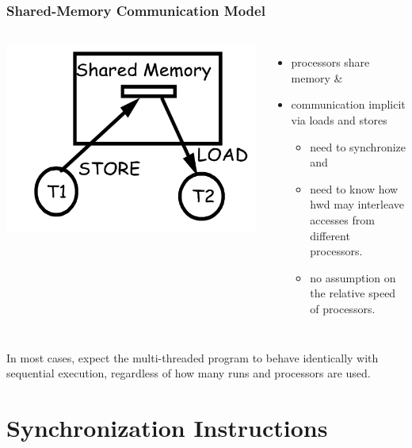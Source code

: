 \documentclass{beamer}
\newcommand{\emp}[1]{\textcolor{DikuRed}{ #1}}
\begin{document}
\begin{frame}[fragile,t]
\frametitle{Shared-Memory Communication Model}

\bigskip
\begin{columns}
\includegraphics[width=27ex]{Ch7Figs/ShMem}\pause
{}
\begin{itemize}
    \item processors share memory \&\medskip
    \item communication implicit via loads and stores
    \begin{itemize}
        \item need to synchronize and\smallskip
        \item need to know how hwd may interleave 
                accesses from different processors.\medskip
        \item \alert{no assumption on the relative speed of processors}.
    \end{itemize}
\end{itemize}
\end{columns}
\bigskip

In most cases, \emp{expect the multi-threaded program to behave identically with
sequential execution}, regardless of how many runs and processors are used. 

\end{frame}

\section{Synchronization Instructions}
\end{document}
